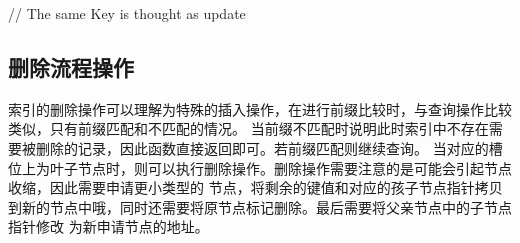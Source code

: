 \begin{breakablealgorithm}
\begin{algorithmic}[1]
\begin{footnotesize}
                \STATE // The same Key is thought as update
                \RETURN {}
            \ENDIF

            \ENDIF
        \ENDIF
        
    \ENDWHILE
    \end{footnotesize}
    \end{algorithmic}
\end{breakablealgorithm}

\subsection{删除流程操作}
索引的删除操作可以理解为特殊的插入操作，在进行前缀比较时，与查询操作比较类似，只有前缀匹配和不匹配的情况。
当前缀不匹配时说明此时索引中不存在需要被删除的记录，因此函数直接返回即可。若前缀匹配则继续查询。
当对应的槽位上为叶子节点时，则可以执行删除操作。删除操作需要注意的是可能会引起节点收缩，因此需要申请更小类型的
节点，将剩余的键值和对应的孩子节点指针拷贝到新的节点中哦，同时还需要将原节点标记删除。最后需要将父亲节点中的子节点指针修改
为新申请节点的地址。



